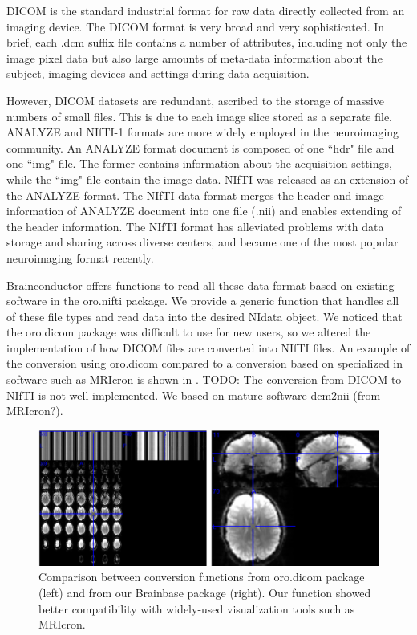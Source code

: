 \documentclass{nature}
\begin{document}
DICOM is the standard industrial
format for raw data directly collected from an imaging device. The DICOM format
is very broad and very sophisticated. In brief, each .dcm suffix file contains a
number of attributes, including not only the image pixel data but also large
amounts of meta-data information about the subject, imaging devices and settings
during data acquisition.

However, DICOM datasets are redundant, ascribed to the storage of massive
numbers of small files. This is due to each image slice stored as a separate
file. ANALYZE and NIfTI-1 formats are more widely employed in the neuroimaging
community. An ANALYZE format document is composed of one ``hdr" file and one
``img" file. The former contains information about the acquisition settings,
while the ``img" file contain the image data. NIfTI was released as an extension
of the ANALYZE format. The NIfTI data format merges the header and image
information of ANALYZE document into one file (.nii) and enables extending of
the header information. The NIfTI format has alleviated problems with data
storage and sharing across diverse centers, and became one of the most popular
neuroimaging format recently.

Brainconductor offers functions to read all these data format
based on existing software in the oro.nifti package. We
provide a generic function that handles all of these file types and read data
into the desired NIdata object.
We noticed that the oro.dicom package was difficult to use for new users, so
we altered the implementation of how DICOM files are converted into NIfTI 
files. An example of the conversion using oro.dicom compared to a conversion
based on specialized in software such as MRIcron\cite{rorden2011mricro} is
shown in .
{\color{red} TODO: The conversion from DICOM to NIfTI is not well implemented.
We based on mature
software dcm2nii (from MRIcron?).}

\begin{figure}[tb]
\centering
\includegraphics[width=400pt]{fig/brainconductor/dicom.png}
\caption{Comparison between conversion functions from oro.dicom package (left) and from our Brainbase  package (right).  Our function showed better compatibility  with widely-used visualization tools such as MRIcron.}
\label{fig:dicom}
\end{figure}
\end{document}
